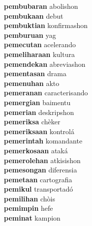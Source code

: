 \textbf{pembubaran } abolishon \\
\textbf{pembukaan } debut \\
\textbf{pembuktian } konfirmashon \\
\textbf{pemburuan } yag \\
\textbf{pemecutan } acelerando \\
\textbf{pemeliharaan } kultura \\
\textbf{pemendekan } abreviashon \\
\textbf{pementasan } drama \\
\textbf{pemenuhan } akto \\
\textbf{pemeranan } caracterisando \\
\textbf{pemergian } baimentu \\
\textbf{pemerian } deskripshon \\
\textbf{pemeriksa } chèker \\
\textbf{pemeriksaan } kontrolá \\
\textbf{pemerintah } komandante \\
\textbf{pemerkosaan } ataká \\
\textbf{pemerolehan } atkisishon \\
\textbf{pemesongan } diferensia \\
\textbf{pemetaan } cartografia \\
\textbf{pemikul } transportadó \\
\textbf{pemilihan } chòis \\
\textbf{pemimpin } hefe \\
\textbf{peminat } kampion \\
